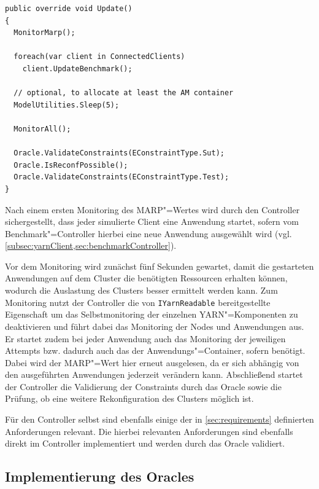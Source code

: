 \begin{lstlisting}[label=lst:controllerUpdate,style=cs,
caption={[Update()"=Methode des Controllers]
    \texttt{Update()}"=Methode des Controllers (gekürzt).
    Eine ausführliche Beschreibung des Ablaufs der Ausführung eines Testfalls findet sich in \cref{subsec:simulationStep}.}]
public override void Update()
{
  MonitorMarp();
  
  foreach(var client in ConnectedClients)
    client.UpdateBenchmark();
  
  // optional, to allocate at least the AM container
  ModelUtilities.Sleep(5);
  
  MonitorAll();
  
  Oracle.ValidateConstraints(EConstraintType.Sut);
  Oracle.IsReconfPossible();
  Oracle.ValidateConstraints(EConstraintType.Test);
}
\end{lstlisting}

Nach einem ersten Monitoring des \ac{MARP}"=Wertes wird durch den Controller sichergestellt, dass jeder simulierte Client eine Anwendung startet, sofern vom Benchmark"=Controller hierbei eine neue Anwendung ausgewählt wird (vgl. \cref{subsec:yarnClient,sec:benchmarkController}).

Vor dem Monitoring wird zunächst fünf Sekunden gewartet, damit die gestarteten Anwendungen auf dem Cluster die benötigten Ressourcen erhalten können, wodurch die Auslastung des Clusters besser ermittelt werden kann.
Zum Monitoring nutzt der Controller die von \texttt{IYarnReadable} bereitgestellte Eigenschaft um das Selbstmonitoring der einzelnen \ac{YARN}"=Komponenten zu deaktivieren und führt dabei das Monitoring der Nodes und Anwendungen aus.
Er startet zudem bei jeder Anwendung auch das Monitoring der jeweiligen Attempts bzw. dadurch auch das der Anwendungs"=Container, sofern benötigt.
Dabei wird der \ac{MARP}"=Wert hier erneut ausgelesen, da er sich abhängig von den ausgeführten Anwendungen jederzeit verändern kann.
Abschließend startet der Controller die Validierung der Constraints durch das Oracle sowie die Prüfung, ob eine weitere Rekonfiguration des Clusters möglich ist.

Für den Controller selbst sind ebenfalls einige der in \cref{sec:requirements} definierten Anforderungen relevant.
Die hierbei relevanten Anforderungen sind ebenfalls direkt im Controller implementiert und werden durch das Oracle validiert.

\subsection{Implementierung des Oracles}
\label{subsec:oracleImpl}

